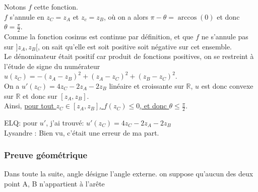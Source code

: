 \documentclass{article}
\begin{document}
Notons $f$ cette fonction.\\
$f$ s'annule en $z_C = z_A$ et $z_c = z_B$, où on a alors $\pi - \theta = \arccos(0)$ et donc $\theta = \frac{\pi}{2}$.\\
Comme la fonction cosinus est continue par définition, et que $f$ ne s'annule pas sur $]z_A, z_B[$, on sait qu'elle est soit positive soit négative sur cet ensemble.\\
Le dénominateur était positif car produit de fonctions positives, on se restreint à l'étude de signe du numérateur $u(z_C) = -(z_A - z_B)^2 + (z_A - z_C)^2 + (z_B- z_C)^2$.\\
On a $u'(z_C) = 4z_C - 2z_A - 2z_B$ linéaire et croissante sur $\mathbb{R}$, $u$ est donc convexe sur $\mathbb{R}$ et donc sur $[z_A, z_B]$.\\
Ainsi, \underline{pour tout $z_C \in [z_A, z_B]$, $f(z_C) \leq 0$, et donc $\theta \leq \frac{\pi}{2}$}.

ELQ: pour $u'$, j'ai trouvé: $u'(z_C) = 4z_C - 2z_A - 2z_B$\\
Lysandre : Bien vu, c'était une erreur de ma part.




\subsubsection{Preuve géométrique}

Dans toute la suite, angle désigne l’angle externe. on suppose qu'aucun des deux point A, B n'appartient à l'arête
\end{document}
